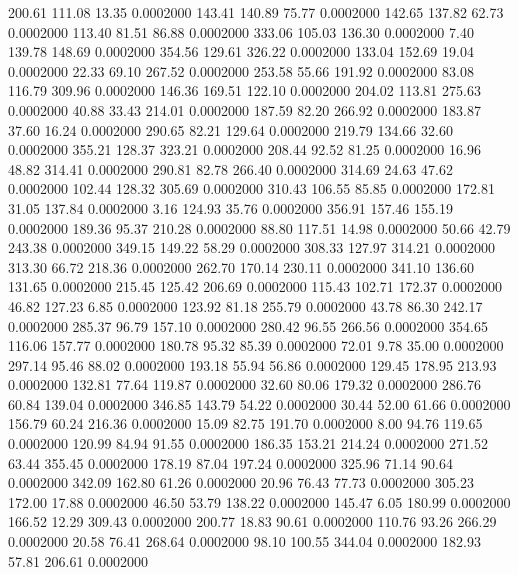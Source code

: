  200.61  111.08   13.35   0.0002000
 143.41  140.89   75.77   0.0002000
 142.65  137.82   62.73   0.0002000
 113.40   81.51   86.88   0.0002000
 333.06  105.03  136.30   0.0002000
   7.40  139.78  148.69   0.0002000
 354.56  129.61  326.22   0.0002000
 133.04  152.69   19.04   0.0002000
  22.33   69.10  267.52   0.0002000
 253.58   55.66  191.92   0.0002000
  83.08  116.79  309.96   0.0002000
 146.36  169.51  122.10   0.0002000
 204.02  113.81  275.63   0.0002000
  40.88   33.43  214.01   0.0002000
 187.59   82.20  266.92   0.0002000
 183.87   37.60   16.24   0.0002000
 290.65   82.21  129.64   0.0002000
 219.79  134.66   32.60   0.0002000
 355.21  128.37  323.21   0.0002000
 208.44   92.52   81.25   0.0002000
  16.96   48.82  314.41   0.0002000
 290.81   82.78  266.40   0.0002000
 314.69   24.63   47.62   0.0002000
 102.44  128.32  305.69   0.0002000
 310.43  106.55   85.85   0.0002000
 172.81   31.05  137.84   0.0002000
   3.16  124.93   35.76   0.0002000
 356.91  157.46  155.19   0.0002000
 189.36   95.37  210.28   0.0002000
  88.80  117.51   14.98   0.0002000
  50.66   42.79  243.38   0.0002000
 349.15  149.22   58.29   0.0002000
 308.33  127.97  314.21   0.0002000
 313.30   66.72  218.36   0.0002000
 262.70  170.14  230.11   0.0002000
 341.10  136.60  131.65   0.0002000
 215.45  125.42  206.69   0.0002000
 115.43  102.71  172.37   0.0002000
  46.82  127.23    6.85   0.0002000
 123.92   81.18  255.79   0.0002000
  43.78   86.30  242.17   0.0002000
 285.37   96.79  157.10   0.0002000
 280.42   96.55  266.56   0.0002000
 354.65  116.06  157.77   0.0002000
 180.78   95.32   85.39   0.0002000
  72.01    9.78   35.00   0.0002000
 297.14   95.46   88.02   0.0002000
 193.18   55.94   56.86   0.0002000
 129.45  178.95  213.93   0.0002000
 132.81   77.64  119.87   0.0002000
  32.60   80.06  179.32   0.0002000
 286.76   60.84  139.04   0.0002000
 346.85  143.79   54.22   0.0002000
  30.44   52.00   61.66   0.0002000
 156.79   60.24  216.36   0.0002000
  15.09   82.75  191.70   0.0002000
   8.00   94.76  119.65   0.0002000
 120.99   84.94   91.55   0.0002000
 186.35  153.21  214.24   0.0002000
 271.52   63.44  355.45   0.0002000
 178.19   87.04  197.24   0.0002000
 325.96   71.14   90.64   0.0002000
 342.09  162.80   61.26   0.0002000
  20.96   76.43   77.73   0.0002000
 305.23  172.00   17.88   0.0002000
  46.50   53.79  138.22   0.0002000
 145.47    6.05  180.99   0.0002000
 166.52   12.29  309.43   0.0002000
 200.77   18.83   90.61   0.0002000
 110.76   93.26  266.29   0.0002000
  20.58   76.41  268.64   0.0002000
  98.10  100.55  344.04   0.0002000
 182.93   57.81  206.61   0.0002000
